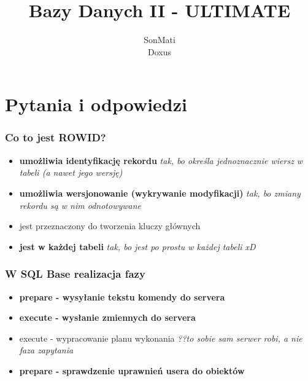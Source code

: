 \documentclass[a4paper,twoside]{article}
\begin{document}
  	
  	
  	\begin{titlepage}
  		\title{\huge Bazy Danych II - ULTIMATE}
  		\author{\large SonMati \\ \large Doxus}
  		\maketitle
  	\end{titlepage}
  	
  	\part*{Pytania i odpowiedzi}
  	\section{Co to jest ROWID?}
  	\begin{itemize}
  		\item[] \textbf{umożliwia identyfikację rekordu} \emph{tak, bo określa jednoznacznie wiersz w tabeli (a nawet jego wersję)}
  		\item[] \textbf{umożliwia wersjonowanie (wykrywanie modyfikacji)} \emph{tak, bo zmiany rekordu są w nim odnotowywane}
  		\item jest przeznaczony do tworzenia kluczy głównych
  		\item \textbf{jest w każdej tabeli} \emph{tak, bo jest po prostu w każdej tabeli xD}
  	\end{itemize}
  	
  	\section{W SQL Base realizacja fazy}
  	\begin{itemize}
  		\item \textbf{prepare - wysyłanie tekstu komendy do servera}
  		\item \textbf{execute - wysłanie zmiennych do servera}
  		\item execute - wypracowanie planu wykonania \emph{??to sobie sam serwer robi, a nie faza zapytania}
  		\item \textbf{prepare - sprawdzenie uprawnień usera do obiektów}
  	\end{itemize}
  	
\end{document}
